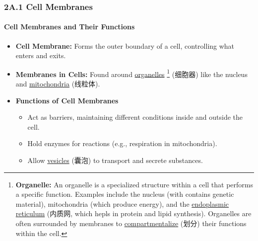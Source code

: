 
\subsubsection{2A.1 Cell Membranes}
\paragraph{Cell Membranes and Their Functions}
\begin{itemize}
    \item \textbf{Cell Membrane:} Forms the outer boundary of a cell, controlling what enters and exits.
    \item \textbf{Membranes in Cells:} Found around \underline{organelles} \footnote{\textbf{Organelle:} An organelle is a
    specialized structure within a cell that performs a specific function. Examples include the nucleus (with contains genetic
    material), mitochondria (which produce energy), and the \underline{endoplasmic reticulum} (内质网, which hepls in protein and
    lipid synthesis). Organelles are often surrounded by membranes to \underline{compartmentalize} (划分) their functions within
    the cell.} (细胞器) like the nucleus and \underline{mitochondria} (线粒体).
    \item \textbf{Functions of Cell Membranes}
    \begin{itemize}
        \item Act as barriers, maintaining different conditions inside and outside the cell.
        \item Hold enzymes for reactions (e.g., respiration in mitochondria).
        \item Allow \underline{vesicles} (囊泡) to transport and secrete substances.
    \end{itemize}
\end{itemize}


